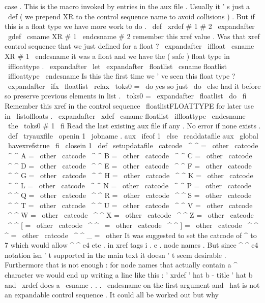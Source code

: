 {{case
.
}
%
This
is
the
macro
invoked
by
entries
in
the
aux
file
.
Usually
it
'
s
%
just
a
\
def
(
we
prepend
XR
to
the
control
sequence
name
to
avoid
%
collisions
)
.
But
if
this
is
a
float
type
we
have
more
work
to
do
.
%
\
def
\
xrdef
#
1
#
2
{
%
\
expandafter
\
gdef
\
csname
XR
#
1
\
endcsname
{
#
2
}
%
remember
this
xref
value
.
%
%
Was
that
xref
control
sequence
that
we
just
defined
for
a
float
?
\
expandafter
\
iffloat
\
csname
XR
#
1
\
endcsname
%
it
was
a
float
and
we
have
the
(
safe
)
float
type
in
\
iffloattype
.
\
expandafter
\
let
\
expandafter
\
floatlist
\
csname
floatlist
\
iffloattype
\
endcsname
%
%
Is
this
the
first
time
we
'
ve
seen
this
float
type
?
\
expandafter
\
ifx
\
floatlist
\
relax
\
toks0
=
{
\
do
}
%
yes
so
just
\
do
\
else
%
had
it
before
so
preserve
previous
elements
in
list
.
\
toks0
=
\
expandafter
{
\
floatlist
\
do
}
%
\
fi
%
%
Remember
this
xref
in
the
control
sequence
\
floatlistFLOATTYPE
%
for
later
use
in
\
listoffloats
.
\
expandafter
\
xdef
\
csname
floatlist
\
iffloattype
\
endcsname
{
\
the
\
toks0
{
#
1
}
}
%
\
fi
}
%
Read
the
last
existing
aux
file
if
any
.
No
error
if
none
exists
.
%
\
def
\
tryauxfile
{
%
\
openin
1
\
jobname
.
aux
\
ifeof
1
\
else
\
readdatafile
{
aux
}
%
\
global
\
havexrefstrue
\
fi
\
closein
1
}
\
def
\
setupdatafile
{
%
\
catcode
\
^
^
=
\
other
\
catcode
\
^
^
A
=
\
other
\
catcode
\
^
^
B
=
\
other
\
catcode
\
^
^
C
=
\
other
\
catcode
\
^
^
D
=
\
other
\
catcode
\
^
^
E
=
\
other
\
catcode
\
^
^
F
=
\
other
\
catcode
\
^
^
G
=
\
other
\
catcode
\
^
^
H
=
\
other
\
catcode
\
^
^
K
=
\
other
\
catcode
\
^
^
L
=
\
other
\
catcode
\
^
^
N
=
\
other
\
catcode
\
^
^
P
=
\
other
\
catcode
\
^
^
Q
=
\
other
\
catcode
\
^
^
R
=
\
other
\
catcode
\
^
^
S
=
\
other
\
catcode
\
^
^
T
=
\
other
\
catcode
\
^
^
U
=
\
other
\
catcode
\
^
^
V
=
\
other
\
catcode
\
^
^
W
=
\
other
\
catcode
\
^
^
X
=
\
other
\
catcode
\
^
^
Z
=
\
other
\
catcode
\
^
^
[
=
\
other
\
catcode
\
^
^
\
=
\
other
\
catcode
\
^
^
]
=
\
other
\
catcode
\
^
^
^
=
\
other
\
catcode
\
^
^
_
=
\
other
%
It
was
suggested
to
set
the
catcode
of
^
to
7
which
would
allow
^
^
e4
etc
.
%
in
xref
tags
i
.
e
.
node
names
.
But
since
^
^
e4
notation
isn
'
t
%
supported
in
the
main
text
it
doesn
'
t
seem
desirable
.
Furthermore
%
that
is
not
enough
:
for
node
names
that
actually
contain
a
^
%
character
we
would
end
up
writing
a
line
like
this
:
'
xrdef
{
'
hat
%
b
-
title
}
{
'
hat
b
}
and
\
xrdef
does
a
\
csname
.
.
.
\
endcsname
on
the
first
%
argument
and
\
hat
is
not
an
expandable
control
sequence
.
It
could
%
all
be
worked
out
but
why
}}
